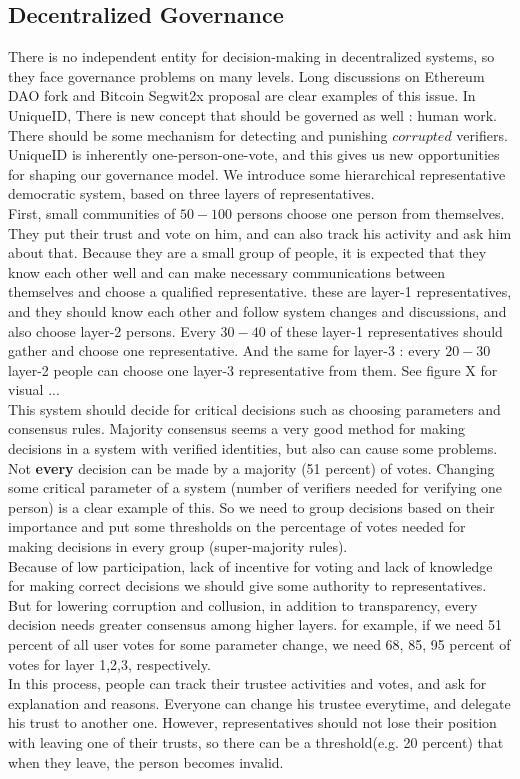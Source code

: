 \documentclass[conference]{IEEEtran}
\begin{document}
\subsection{Decentralized Governance}
There is no independent entity for decision-making in decentralized systems, so they face governance problems on many levels. Long discussions on Ethereum DAO fork and Bitcoin Segwit2x proposal are clear examples of this issue. In UniqueID, There is new concept that should be governed as well : human work. There should be some mechanism for detecting and punishing $corrupted$ verifiers.
\\
UniqueID is inherently one-person-one-vote, and this gives us new opportunities for shaping our governance model. We introduce some hierarchical representative democratic system, based on three layers of representatives. 
\\
First, small communities of $50-100$ persons choose one person from themselves. They put their trust and vote on him, and can also track his activity and ask him about that. Because they are a small group of people, it is expected that they know each other well and can make necessary communications between themselves and choose a qualified representative. these are layer-1 representatives, and they should know each other and follow system changes and discussions, and also choose layer-2 persons. Every $30-40$ of these layer-1 representatives should gather and choose one representative. And the same for layer-3 : every $20-30$ layer-2 people can choose one layer-3 representative from them. See figure X for visual ...
\\
This system should decide for critical decisions such as choosing parameters and consensus rules. Majority consensus seems a very good method for making decisions in a system with verified identities, but also can cause some problems. Not \textbf{every} decision can be made by a majority (51 percent) of votes. Changing some critical parameter of a system (number of verifiers needed for verifying one person) is a clear example of this. So we need to group decisions based on their importance and put some thresholds on the percentage of votes needed for making decisions in every group (super-majority rules).
\\
Because of low participation, lack of incentive for voting and lack of knowledge for making correct decisions we should give some authority to representatives. But for lowering corruption and collusion, in addition to transparency, every decision needs greater consensus among higher layers. for example, if we need 51 percent of all user votes for some parameter change, we need 68, 85, 95 percent  of votes for layer 1,2,3, respectively.
\\
In this process, people can track their trustee activities and votes, and ask for explanation and reasons. Everyone can change his trustee everytime, and delegate his trust to another one. However, representatives should not lose their position with leaving one of their trusts, so there can be a threshold(e.g. 20 percent) that when they leave, the person becomes invalid. \\
\end{document}
